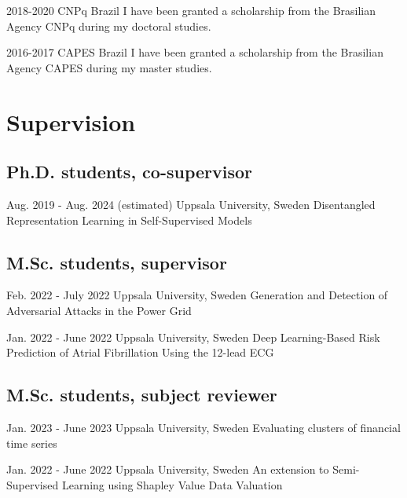\documentclass[10pt,letterpaper]{article} %
\begin{document}
    { 2018-2020 }
    { CNPq }
    { Brazil }
    { I have been granted a scholarship from the Brasilian Agency CNPq during my doctoral studies. }

    { 2016-2017 }
    { CAPES }
    { Brazil }
    { I have been granted a scholarship from the Brasilian Agency CAPES during my master studies. }


\section*{Supervision}


\subsection*{\noindent Ph.D. students, co-supervisor  }
    
        { Aug. 2019 - Aug. 2024 (estimated) }
        {  }
        { Uppsala University, Sweden }
        { { Disentangled Representation Learning in Self-Supervised Models } }
        

\subsection*{\noindent M.Sc. students, supervisor  }
    
        { Feb. 2022 - July 2022 }
        {  }
        { Uppsala University, Sweden }
        { { Generation and Detection of Adversarial Attacks in the Power Grid } }
        
        { Jan. 2022 - June 2022 }
        {  }
        { Uppsala University, Sweden }
        { { Deep Learning-Based Risk Prediction of Atrial Fibrillation Using the 12-lead ECG } }
        

\subsection*{\noindent M.Sc. students, subject reviewer  }
    
        { Jan. 2023 - June 2023 }
        {  }
        { Uppsala University, Sweden }
        { { Evaluating clusters of financial time series } }
        
        { Jan. 2022 - June 2022 }
        {  }
        { Uppsala University, Sweden }
        { { An extension to Semi-Supervised Learning using Shapley Value Data Valuation } }
        
\end{document}
